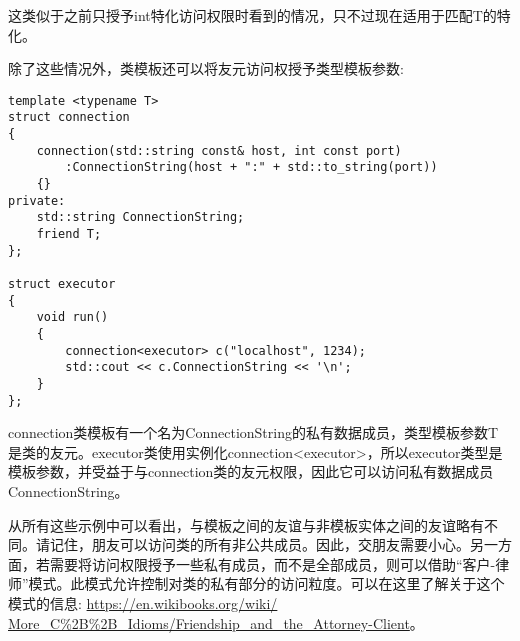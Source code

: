 这类似于之前只授予int特化访问权限时看到的情况，只不过现在适用于匹配T的特化。

除了这些情况外，类模板还可以将友元访问权授予类型模板参数:

\begin{lstlisting}[style=styleCXX]
template <typename T>
struct connection
{
	connection(std::string const& host, int const port)
		:ConnectionString(host + ":" + std::to_string(port))
	{}
private:
	std::string ConnectionString;
	friend T;
};

struct executor
{
	void run()
	{
		connection<executor> c("localhost", 1234);
		std::cout << c.ConnectionString << '\n';
	}
};
\end{lstlisting}

connection类模板有一个名为ConnectionString的私有数据成员，类型模板参数T是类的友元。executor类使用实例化connection<executor>，所以executor类型是模板参数，并受益于与connection类的友元权限，因此它可以访问私有数据成员ConnectionString。
 
从所有这些示例中可以看出，与模板之间的友谊与非模板实体之间的友谊略有不同。请记住，朋友可以访问类的所有非公共成员。因此，交朋友需要小心。另一方面，若需要将访问权限授予一些私有成员，而不是全部成员，则可以借助“客户-律师”模式。此模式允许控制对类的私有部分的访问粒度。可以在这里了解关于这个模式的信息: \url{https://en.wikibooks.org/wiki/ More_C%2B%2B_Idioms/Friendship_and_the_Attorney-Client}。


